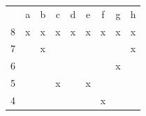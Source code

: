 \documentclass{article}
\begin{document}
\begin{table}[h]
    \centering
    \begin{tabular}{ccccccccc}
                        & a                      & b                                             & c                                             & d                                             & e                                             & f                                             & g                                             & h                                             \\ \cline{2-9} 
    \multicolumn{1}{c|}{8} & \multicolumn{1}{c|}{x} & \multicolumn{1}{c|}{{\color[HTML]{FFFFFF} x}} & \multicolumn{1}{c|}{{\color[HTML]{FFFFFF} x}} & \multicolumn{1}{c|}{{\color[HTML]{FFFFFF} x}} & \multicolumn{1}{c|}{{\color[HTML]{FFFFFF} x}} & \multicolumn{1}{c|}{{\color[HTML]{FFFFFF} x}} & \multicolumn{1}{c|}{{\color[HTML]{FFFFFF} x}} & \multicolumn{1}{c|}{{\color[HTML]{FFFFFF} x}} \\ \cline{2-9} 
    \multicolumn{1}{c|}{7} & \multicolumn{1}{c|}{}  & \multicolumn{1}{c|}{x}                        & \multicolumn{1}{c|}{}                         & \multicolumn{1}{c|}{}                         & \multicolumn{1}{c|}{}                         & \multicolumn{1}{c|}{}                         & \multicolumn{1}{c|}{}                         & \multicolumn{1}{c|}{x}                        \\ \cline{2-9} 
    \multicolumn{1}{c|}{6} & \multicolumn{1}{c|}{}  & \multicolumn{1}{c|}{}                         & \multicolumn{1}{c|}{}                         & \multicolumn{1}{c|}{}                         & \multicolumn{1}{c|}{}                         & \multicolumn{1}{c|}{}                         & \multicolumn{1}{c|}{x}                        & \multicolumn{1}{c|}{}                         \\ \cline{2-9} 
    \multicolumn{1}{c|}{5} & \multicolumn{1}{c|}{}  & \multicolumn{1}{c|}{}                         & \multicolumn{1}{c|}{x}                        & \multicolumn{1}{c|}{}                         & \multicolumn{1}{c|}{x}                        & \multicolumn{1}{c|}{}                         & \multicolumn{1}{c|}{}                         & \multicolumn{1}{c|}{}                         \\ \cline{2-9} 
    \multicolumn{1}{c|}{4} & \multicolumn{1}{c|}{}  & \multicolumn{1}{c|}{}                         & \multicolumn{1}{c|}{}                         & \multicolumn{1}{c|}{}                         & \multicolumn{1}{c|}{}                         & \multicolumn{1}{c|}{x}                        & \multicolumn{1}{c|}{}                         & \multicolumn{1}{c|}{}                         \\ \cline{2-9} 

\end{tabular}
\end{table}
\end{document}
